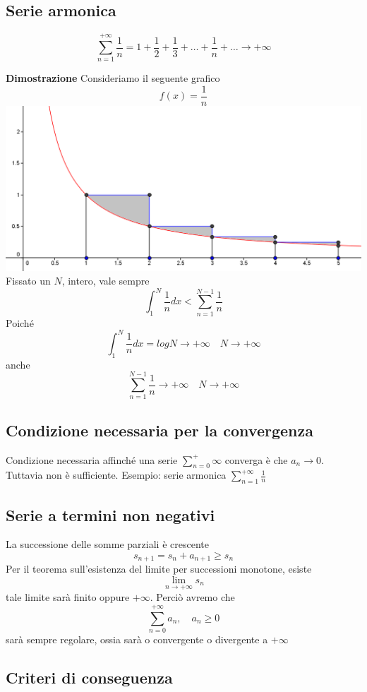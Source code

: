 \documentclass[12pt]{article}
\begin{document}
\subsection{Serie armonica}
\[ \sum_{n=1}^{+\infty} \frac{1}{n} = 1 + \frac{1}{2} + \frac{1}{3} + \dots + \frac{1}{n} + \dots \to +\infty \]

\textbf{Dimostrazione}\newline
Consideriamo il seguente grafico
\[ f(x) = \frac{1}{n} \]
\includegraphics[width=\textwidth]{images/armonica.png}
Fissato un \(N\), intero, vale sempre 
\[ \int_1^N \frac{1}{n} dx  < \sum_{n=1}^{N-1} \frac{1}{n}\]
Poiché
\[ \int_1^N \frac{1}{n} dx = logN \to +\infty \quad N\to +\infty \]
anche
\[  \sum_{n=1}^{N-1} \frac{1}{n} \to +\infty \quad N \to +\infty \]

\subsection{Condizione necessaria per la convergenza}
Condizione necessaria affinché una serie \(\displaystyle \sum_{n=0}^+\infty\)
converga è che \( a_n \to 0\). Tuttavia non è sufficiente. Esempio: serie armonica \(\displaystyle \sum_{n=1}^{+\infty} \frac{1}{n}\)

\subsection{Serie a termini non negativi}
La successione delle somme parziali è crescente
\[
s_{n+1} = s_n + a_{n+1} \geq s_n
\]
Per il teorema sull'esistenza del limite per successioni monotone, esiste 
\[
\lim_{n \to +\infty} s_n
\]
tale limite sarà finito oppure $+\infty$. Perciò avremo che
\[
\sum_{n=0}^{+\infty} a_n, \quad a_n \geq 0
\]
sarà sempre regolare, ossia sarà o convergente o divergente a $+\infty$

\subsection{Criteri di conseguenza}
\end{document}
